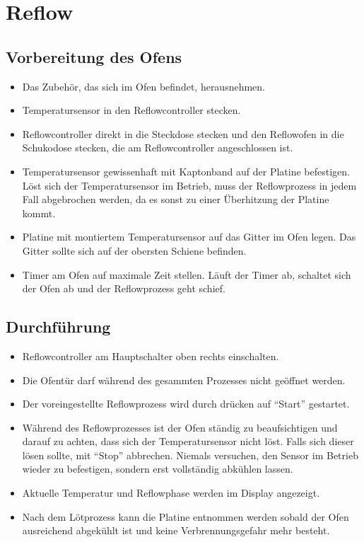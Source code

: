 \documentclass{\basedir/fablab-document}
\begin{document}
\section{Reflow}
\subsection{Vorbereitung des Ofens}
\begin{itemize}
		\item Das Zubehör, das sich im Ofen befindet, herausnehmen.
		\item Temperatursensor in den Reflowcontroller stecken.
		\item Reflowcontroller direkt in die Steckdose stecken und den Reflowofen in die Schukodose stecken, die am Reflowcontroller angeschlossen ist.
		\item Temperatursensor gewissenhaft mit Kaptonband auf der Platine befestigen. Löst sich der Temperatursensor im Betrieb, muss der Reflowprozess in jedem Fall abgebrochen werden, da es sonst zu einer Überhitzung der Platine kommt.
		\item Platine mit montiertem Temperatursensor auf das Gitter im Ofen legen. Das Gitter sollte sich auf der obersten Schiene befinden.
		\item Timer am Ofen auf maximale Zeit stellen. Läuft der Timer ab, schaltet sich der Ofen ab und der Reflowprozess geht schief.
\end{itemize}
\subsection{Durchführung}
\begin{itemize}
		\item Reflowcontroller am Hauptschalter oben rechts einschalten.
		\item Die Ofentür darf während des gesammten Prozesses nicht geöffnet werden.
		\item Der voreingestellte Reflowprozess wird durch drücken auf \enquote{Start} gestartet.
		\item Während des Reflowprozesses ist der Ofen ständig zu beaufsichtigen und darauf zu achten, dass sich der Temperatursensor nicht löst. Falls sich dieser lösen sollte, mit \enquote{Stop} abbrechen. Niemals versuchen, den Sensor im Betrieb wieder zu befestigen, sondern erst vollständig abkühlen lassen.
		\item Aktuelle Temperatur und Reflowphase werden im Display angezeigt.
		\item Nach dem Lötprozess kann die Platine entnommen werden sobald der Ofen ausreichend abgekühlt ist und keine Verbrennungsgefahr mehr besteht.
\end{itemize}
\end{document}
